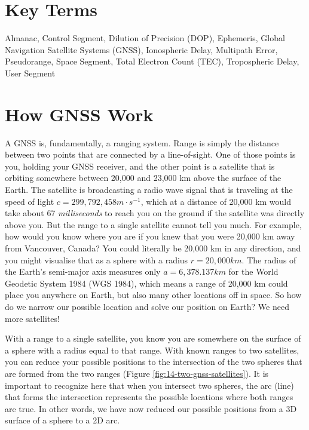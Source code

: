 \documentclass[
]{book}
\begin{document}
\section*{Key Terms}\label{key-terms-11}

Almanac, Control Segment, Dilution of Precision (DOP), Ephemeris, Global Navigation Satellite Systems (GNSS), Ionospheric Delay, Multipath Error, Pseudorange, Space Segment, Total Electron Count (TEC), Tropospheric Delay, User Segment

\section{How GNSS Work}\label{how-gnss-work}

A GNSS is, fundamentally, a ranging system. Range is simply the distance between two points that are connected by a line-of-sight. One of those points is you, holding your GNSS receiver, and the other point is a satellite that is orbiting somewhere between 20,000 and 23,000 km above the surface of the Earth. The satellite is broadcasting a radio wave signal that is traveling at the speed of light \(c = 299,792,458 m·s^{-1}\), which at a distance of 20,000 km would take about 67 \emph{milliseconds} to reach you on the ground if the satellite was directly above you. But the range to a single satellite cannot tell you much. For example, how would you know where you are if you knew that you were 20,000 km away from Vancouver, Canada? You could literally be 20,000 km in any direction, and you might visualise that as a sphere with a radius \(r = 20,000 km\). The radius of the Earth's semi-major axis measures only \(a=6,378.137km\) for the World Geodetic System 1984 (WGS 1984), which means a range of 20,000 km could place you anywhere on Earth, but also many other locations off in space. So how do we narrow our possible location and solve our position on Earth? We need more satellites!

With a range to a single satellite, you know you are somewhere on the surface of a sphere with a radius equal to that range. With known ranges to two satellites, you can reduce your possible positions to the intersection of the two spheres that are formed from the two ranges (Figure \ref{fig:14-two-gnss-satellites}). It is important to recognize here that when you intersect two spheres, the arc (line) that forms the intersection represents the possible locations where both ranges are true. In other words, we have now reduced our possible positions from a 3D surface of a sphere to a 2D arc.
\end{document}
